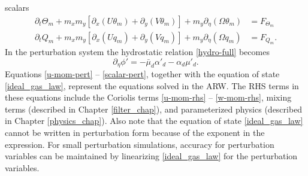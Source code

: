 scalars
\begin{align}
\partial_t \Theta_m
+ m_x m_y[\partial_x (U\theta_m) + \partial_y (V\theta_m)] + m_y \partial_\eta (\Omega \theta_m)
& = F_{\Theta_m} \\
%
\partial_t Q_m 
+ m_x m_y[\partial_x (U q_m) + \partial_y (V q_m)] + m_y \partial_\eta (\Omega q_m)
& = F_{Q_m}.
\label{scalar-pert}
\end{align}
%
\noindent
In the perturbation system
the hydrostatic relation \eqref{hydro-full} becomes
%
\begin{equation}
\partial_\eta \phi' =-\bar\mu_d \alpha'_d-\alpha_d\mu'_d.
\label{hydro-pert}
\end{equation}
%
Equations \eqref{u-mom-pert} -- \eqref{scalar-pert},
together with the equation of state \eqref{ideal_gas_law},
represent the equations solved in the ARW.
The RHS terms in these equations include the
Coriolis terms \eqref{u-mom-rhs} -- \eqref{w-mom-rhs},
mixing terms (described in Chapter \ref{filter_chap}), and
parameterized physics (described in Chapter \ref{physics_chap}).  
Also note that the equation of state \eqref{ideal_gas_law} cannot be
written in perturbation form because of the exponent in the expression.
For small perturbation simulations, accuracy for perturbation variables
can be maintained by linearizing \eqref{ideal_gas_law} for the
perturbation variables.
%


